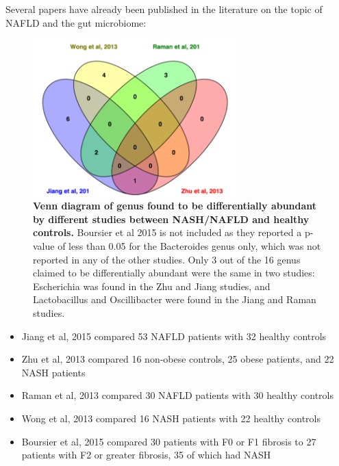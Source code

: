 Several papers have already been published in the literature on the topic of NAFLD and the gut microbiome:

\begin{figure}[h]
\begin{center}
\includegraphics[width=0.7\textwidth]{nafld_papers.png}
\caption{\textbf{Venn diagram of genus found to be differentially abundant by different studies between NASH/NAFLD and healthy controls.} Boursier et al 2015 is not included as they reported a p-value of less than 0.05 for the Bacteroides genus only, which was not reported in any of the other studies. Only 3 out of the 16 genus claimed to be differentially abundant were the same in two studies: Escherichia was found in the Zhu \cite{zhu2013characterization} and Jiang \cite{jiang2015dysbiosis} studies, and Lactobacillus and Oscillibacter were found in the Jiang \cite{jiang2015dysbiosis} and Raman \cite{raman2013fecal} studies.}
\end{center}
\label{nafld_fig1}
\end{figure}

\begin{itemize}
\item Jiang et al, 2015 \cite{jiang2015dysbiosis} compared 53 NAFLD patients with 32 healthy controls

\item Zhu et al, 2013 \cite{zhu2013characterization} compared 16 non-obese controls, 25 obese patients, and 22 NASH patients

\item Raman et al, 2013 \cite{raman2013fecal} compared 30 NAFLD patients with 30 healthy controls

\item Wong et al, 2013 \cite{wong2013molecular} compared 16 NASH patients with 22 healthy controls

\item Boursier et al, 2015 \cite{boursier2016severity} compared 30 patients with F0 or F1 fibrosis to 27 patients with F2 or greater fibrosis, 35 of which had NASH
\end{itemize}

